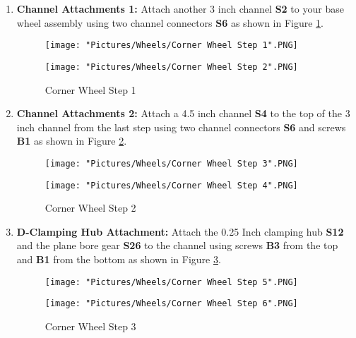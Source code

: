 \documentclass[12pt]{article}
\begin{document}
\begin{enumerate}
\item \textbf{Channel Attachments 1:} Attach another 3 inch channel \textbf{S2} to your base wheel assembly using two channel connectors \textbf{S6} as shown in Figure \ref{corner wheel step 1}.

\begin{figure}[H]
  \centering
  \begin{minipage}[b]{0.45\textwidth}
    \texttt{[image: "Pictures/Wheels/Corner Wheel Step 1".PNG]}
  \end{minipage}
  \hfill
  \begin{minipage}[b]{0.45\textwidth}
    \texttt{[image: "Pictures/Wheels/Corner Wheel Step 2".PNG]}
  \end{minipage}
  \caption{Corner Wheel Step 1}
  \label{corner wheel step 1}
\end{figure}

\item \textbf{Channel Attachments 2:} Attach a 4.5 inch channel \textbf{S4} to the top of the 3 inch channel from the last step using two channel connectors \textbf{S6} and screws \textbf{B1} as shown in Figure \ref{corner wheel step 2}.

\begin{figure}[H]
  \centering
  \begin{minipage}[b]{0.45\textwidth}
    \texttt{[image: "Pictures/Wheels/Corner Wheel Step 3".PNG]}
  \end{minipage}
  \hfill
  \begin{minipage}[b]{0.45\textwidth}
    \texttt{[image: "Pictures/Wheels/Corner Wheel Step 4".PNG]}
  \end{minipage}
  \caption{Corner Wheel Step 2}
  \label{corner wheel step 2}
\end{figure}

\item \textbf{D-Clamping Hub Attachment:} Attach the 0.25 Inch clamping hub \textbf{S12} and the plane bore gear \textbf{S26} to the channel using screws \textbf{B3} from the top and \textbf{B1} from the bottom as shown in Figure \ref{corner wheel hub attachment}.

\begin{figure}[H]
  \centering
  \begin{minipage}[b]{0.45\textwidth}
    \texttt{[image: "Pictures/Wheels/Corner Wheel Step 5".PNG]}
  \end{minipage}
  \hfill
  \begin{minipage}[b]{0.45\textwidth}
    \texttt{[image: "Pictures/Wheels/Corner Wheel Step 6".PNG]}
  \end{minipage}
  \caption{Corner Wheel Step 3}
  \label{corner wheel hub attachment}
\end{figure}


\end{enumerate}
\end{document}
